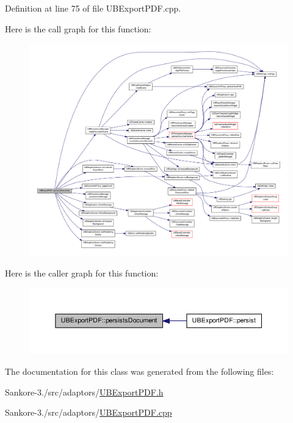 Definition at line 75 of file U\-B\-Export\-P\-D\-F.\-cpp.



Here is the call graph for this function\-:
\nopagebreak
\begin{figure}[H]
\begin{center}
\leavevmode
\includegraphics[width=350pt]{d8/df1/class_u_b_export_p_d_f_a2f2ecd2c4bde9f95f670157f6635ea7d_cgraph}
\end{center}
\end{figure}




Here is the caller graph for this function\-:
\nopagebreak
\begin{figure}[H]
\begin{center}
\leavevmode
\includegraphics[width=350pt]{d8/df1/class_u_b_export_p_d_f_a2f2ecd2c4bde9f95f670157f6635ea7d_icgraph}
\end{center}
\end{figure}




The documentation for this class was generated from the following files\-:\begin{DoxyCompactItemize}
\item 
Sankore-\/3./src/adaptors/\hyperlink{_u_b_export_p_d_f_8h}{U\-B\-Export\-P\-D\-F.\-h}\item 
Sankore-\/3./src/adaptors/\hyperlink{_u_b_export_p_d_f_8cpp}{U\-B\-Export\-P\-D\-F.\-cpp}\end{DoxyCompactItemize}
